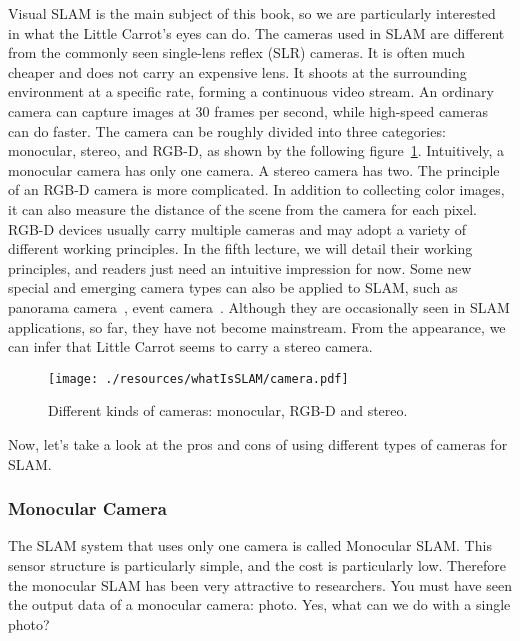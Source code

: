 Visual SLAM is the main subject of this book, so we are particularly interested in what the Little Carrot's eyes can do. The cameras used in SLAM are different from the commonly seen single-lens reflex (SLR) cameras. It is often much cheaper and does not carry an expensive lens. It shoots at the surrounding environment at a specific rate, forming a continuous video stream. An ordinary camera can capture images at 30 frames per second, while high-speed cameras can do faster. The camera can be roughly divided into three categories: monocular, stereo, and RGB-D, as shown by the following figure~\ref{fig:cameras}. Intuitively, a monocular camera has only one camera. A stereo camera has two. The principle of an RGB-D camera is more complicated. In addition to collecting color images, it can also measure the distance of the scene from the camera for each pixel. RGB-D devices usually carry multiple cameras and may adopt a variety of different working principles. In the fifth lecture, we will detail their working principles, and readers just need an intuitive impression for now. Some new special and emerging camera types can also be applied to SLAM, such as panorama camera~\cite{Pretto2011}, event camera~\cite{Rueckauer2016}. Although they are occasionally seen in SLAM applications, so far, they have not become mainstream. From the appearance, we can infer that Little Carrot seems to carry a stereo camera.

\begin{figure}
	\centering
	\texttt{[image: ./resources/whatIsSLAM/camera.pdf]}
	\caption{Different kinds of cameras: monocular, RGB-D and stereo. }
	\label{fig:cameras}
\end{figure}

Now, let's take a look at the pros and cons of using different types of cameras for SLAM.

\subsubsection{Monocular Camera}

The SLAM system that uses only one camera is called Monocular SLAM. This sensor structure is particularly simple, and the cost is particularly low. Therefore the monocular SLAM has been very attractive to researchers. You must have seen the output data of a monocular camera: photo. Yes, what can we do with a single photo?

